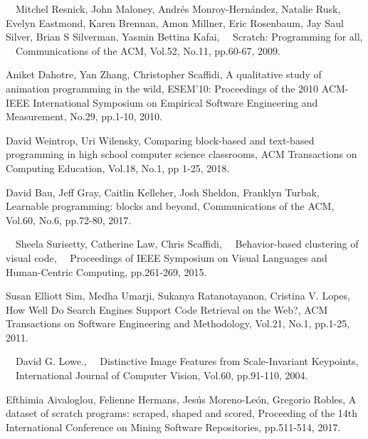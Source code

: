 \documentclass[11pt]{jreport}
\begin{document}
\begin{thebibliography}{99}

　Mitchel Resnick, John Maloney, Andr\'{e}s Monroy-Hern\'{a}ndez, Natalie Rusk, Evelyn Eastmond, Karen Brennan, 
    Amon Millner, Eric Rosenbaum, Jay Saul Silver, Brian S Silverman, Yasmin Bettina Kafai,
　Scratch: Programming for all,
　Communications of the ACM, Vol.52, No.11, pp.60-67, 2009.

    Aniket Dahotre, Yan Zhang, Christopher Scaffidi,
    A qualitative study of animation programming in the wild,
    ESEM'10: Proceedings of the 2010 ACM-IEEE International Symposium on Empirical Software Engineering and Measurement,
    No.29, pp.1-10, 2010.
    
    David Weintrop, Uri Wilensky,
    Comparing block-based and text-based programming in high school computer science classrooms,
    ACM Transactions on Computing Education, Vol.18, No.1, pp 1-25, 2018.
    
    David Bau, Jeff Gray, Caitlin Kelleher, Josh Sheldon, Franklyn Turbak,
    Learnable programming: blocks and beyond,
    Communications of the ACM, Vol.60, No.6, pp.72-80, 2017. 

　Sheela Surisetty, Catherine Law, Chris Scaffidi, 
　Behavior-based clustering of visual code,
　Proceedings of IEEE Symposium on Visual Languages and Human-Centric Computing, pp.261-269, 2015.

    Susan Elliott Sim, Medha Umarji, Sukanya Ratanotayanon, Cristina V. Lopes,
    How Well Do Search Engines Support Code Retrieval on the Web?,
    ACM Transactions on Software Engineering and Methodology, Vol.21, No.1, pp.1-25, 2011.

　David G. Lowe.,
　Distinctive Image Features from Scale-Invariant Keypoints,
　International Journal of Computer Vision, Vol.60, pp.91-110, 2004.


    Efthimia Aivaloglou, Felienne Hermans, Jes\'{u}s Moreno-Le\'{o}n, Gregorio Robles,
    A dataset of scratch programs: scraped, shaped and scored,
    Proceeding of the 14th International Conference on Mining Software Repositories, pp.511-514, 2017.
　
\end{thebibliography}


% 
% 
% 

\end{document}
